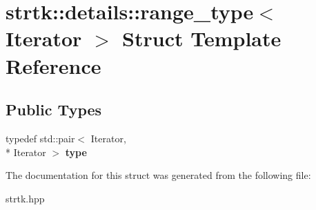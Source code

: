 \hypertarget{structstrtk_1_1details_1_1range__type}{\section{strtk\-:\-:details\-:\-:range\-\_\-type$<$ Iterator $>$ Struct Template Reference}
\label{structstrtk_1_1details_1_1range__type}
}
\subsection*{Public Types}
\begin{DoxyCompactItemize}
\item 
\hypertarget{structstrtk_1_1details_1_1range__type_a33933b70fd000835a9a426b2815dc208}{typedef std\-::pair$<$ Iterator, \\*
Iterator $>$ {\bfseries type}}\label{structstrtk_1_1details_1_1range__type_a33933b70fd000835a9a426b2815dc208}

\end{DoxyCompactItemize}


The documentation for this struct was generated from the following file\-:\begin{DoxyCompactItemize}
\item 
strtk.\-hpp\end{DoxyCompactItemize}
